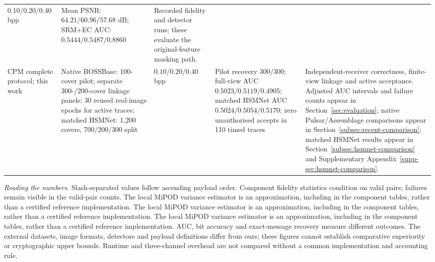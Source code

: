 \documentclass[pdflatex,sn-mathphys-num]{sn-jnl}%
\theoremstyle{definition}
\theoremstyle{game}
\theoremstyle{thmstyleone}%
\theoremstyle{thmstyletwo}%
\theoremstyle{thmstylethree}%
\begin{document}
\begin{table}
\begin{tabularx}{0.98\textheight}{@{}L{0.78}L{1.08}L{0.86}L{1.23}L{1.05}@{}}
$0.10/0.20/0.40$ bpp &
Mean PSNR: $64.21/60.96/57.68$ dB; SRM+EC AUC: $0.5444/0.5487/0.8860$ &
Recorded fidelity and detector runs; these evaluate the original-feature masking path.\\
\addlinespace[3pt]
CPM complete protocol; this work &
Native BOSSBase: 100-cover pilot; separate 300-/200-cover linkage panels;
30 reused real-image epochs for active traces; matched HSMNet:
1,200 covers, 700/200/300 split &
$0.10/0.20/0.40$ bpp &
Pilot recovery $300/300$; full-view AUC $0.5023/0.5119/0.4905$;
matched HSMNet AUC $0.5024/0.5054/0.5170$;
zero unauthorised accepts in 110 timed traces &
Independent-receiver correctness, finite-view linkage and active acceptance.
Adjusted AUC intervals and failure counts appear in Section~\ref{sec:evaluation};
native Pulsar/Assemblage comparisons appear in Section~\ref{subsec:recent-comparison};
matched HSMNet results appear in Section~\ref{subsec:hsmnet-comparison}
and Supplementary Appendix~\ref{supp-sec:hsmnet-comparison}.\\
\bottomrule
\end{tabularx}
\par\vspace{4pt}
\begin{minipage}{0.98\textheight}
\footnotesize
\textit{Reading the numbers.} Slash-separated values follow ascending payload order.
Component fidelity statistics condition on valid pairs; failures remain visible in the valid-pair counts.
The local MiPOD variance estimator is an approximation, including in the
component tables, rather than a certified reference implementation.
The local MiPOD variance estimator is an approximation, including in the
component tables, rather than a certified reference implementation.
The local MiPOD variance estimator is an approximation, including in the
component tables, rather than a certified reference implementation.
AUC, bit accuracy and exact-message recovery measure different outcomes.
The external datasets, image formats, detectors and payload definitions differ from ours;
these figures cannot establish comparative superiority or cryptographic upper bounds.
Runtime and three-channel overhead are not compared without a common implementation and accounting rule.
\end{minipage}
\end{table}
\end{document}
